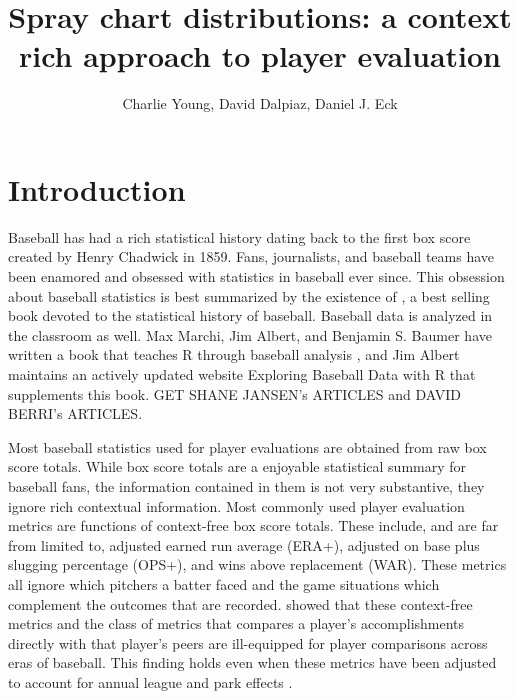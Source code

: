 \documentclass[11pt]{article}
\title{Spray chart distributions: a context rich approach to player evaluation}
\author{Charlie Young, David Dalpiaz, Daniel J. Eck}
\begin{document}
\maketitle

\begin{abstract}

\end{abstract}



\section{Introduction}

Baseball has had a rich statistical history dating back to the first box score created by Henry Chadwick in 1859. Fans, journalists, and baseball teams have been enamored and obsessed with statistics in baseball ever since. This obsession about baseball statistics is best summarized by the existence of \cite{schwarz2004numbers}, a best selling book devoted to the statistical history of baseball. Baseball data is analyzed in the classroom as well. Max Marchi, Jim Albert, and Benjamin S. Baumer have written a book that teaches R through baseball analysis \citep{marchi2019analyzing}, and Jim Albert maintains an actively updated website Exploring Baseball Data with R that supplements this book. GET SHANE JANSEN's ARTICLES and DAVID BERRI's ARTICLES.


Most baseball statistics used for player evaluations are obtained from raw box score totals. While box score totals are a enjoyable statistical summary for baseball fans, the information contained in them is not very substantive, they ignore rich contextual information. Most commonly used player evaluation metrics are functions of context-free box score totals. These include, and are far from limited to, adjusted earned run average (ERA+), adjusted on base plus slugging percentage (OPS+), and wins above replacement (WAR). These metrics all ignore which pitchers a batter faced and the game situations which complement the outcomes that are recorded. \cite{eck2020challenging} showed that these context-free metrics and the class of metrics that compares a player's accomplishments directly with that player's peers are ill-equipped for player comparisons across eras of baseball. This finding holds even when these metrics have been adjusted to account for annual league and park effects \citep{eck2020challenging}. 
\end{document}
